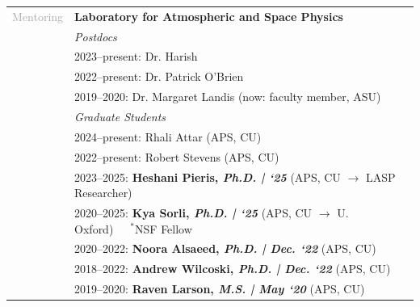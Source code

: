 \documentclass[letterpaper,10pt,twoside]{article}
\begin{document}
\noindent \begin{tabular}{@{} l l}
 \large{\textcolor{darkgray}{Mentoring}} & \textbf{Laboratory for Atmospheric and Space Physics} \\
 & \textit{Postdocs} \\
 & \hspace{0.25in} 2023--present: Dr. Harish\\
 & \hspace{0.25in} 2022--present: Dr. Patrick O'Brien\\
 & \hspace{0.25in} 2019--2020: Dr. Margaret Landis (now: faculty member, ASU)\\ 
 & \textit{Graduate Students} \\
 & \hspace{0.25in} 2024--present: Rhali Attar (APS, CU) \\
 & \hspace{0.25in} 2022--present: Robert Stevens (APS, CU) \\
 & \hspace{0.25in} 2023--2025: \textbf{Heshani Pieris, \textit{Ph.D. | `25}} (APS, CU $\rightarrow$ LASP Researcher) \\
 & \hspace{0.25in} 2020--2025: \textbf{Kya Sorli, \textit{Ph.D. | `25}} (APS, CU $\rightarrow$ U. Oxford)~~~$^*$NSF Fellow \\
 & \hspace{0.25in} 2020--2022: \textbf{Noora Alsaeed, \textit{Ph.D. | Dec. `22}} (APS, CU) \\
 & \hspace{0.25in} 2018--2022: \textbf{Andrew Wilcoski, \textit{Ph.D. | Dec. `22}} (APS, CU) \\
 & \hspace{0.25in} 2019--2020: \textbf{Raven Larson, \textit{M.S. | May `20}} (APS, CU) \\


\end{tabular}
\end{document}
